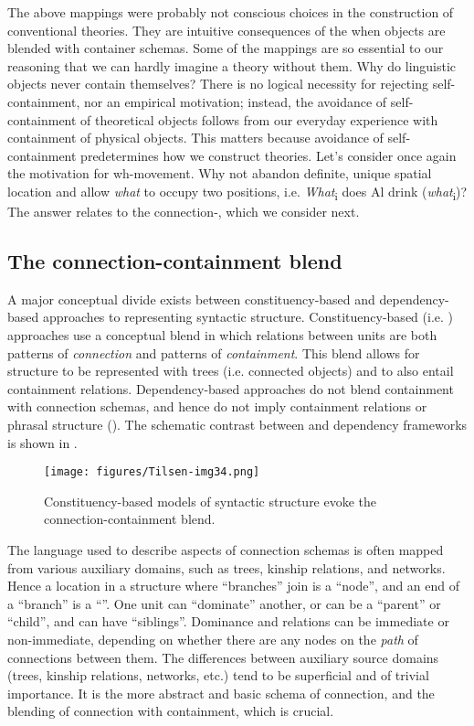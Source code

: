   The above mappings were probably not conscious choices in the construction of conventional theories. They are intuitive consequences of the  when objects are blended with container schemas. Some of the mappings are so essential to our reasoning that we can hardly imagine a theory without them. Why do linguistic objects never contain themselves? There is no logical necessity for rejecting self-containment, nor an empirical motivation; instead, the avoidance of self-containment of theoretical objects follows from our everyday experience with containment of physical objects. This matters because avoidance of self-containment predetermines how we construct theories. Let's consider once again the motivation for wh-movement. Why not abandon definite, unique spatial location and allow \textit{what} to occupy two positions, i.e. \textit{What}\textsubscript{i} does Al drink (\textit{what}\textsubscript{i})? The answer relates to the connection-, which we consider next.

\subsection{The connection-containment blend}

A major conceptual divide exists between constituency-based and dependency-based approaches to representing syntactic structure. Constituency-based (i.e. ) approaches use a conceptual blend in which relations between units are both patterns of \textit{connection} and patterns of \textit{containment}. This blend allows for structure to be represented with trees (i.e. connected objects) and to also entail containment relations. Dependency-based approaches do not blend containment with connection schemas, and hence do not imply containment relations or phrasal structure (\citealt{Hays1964,Melʹčuk1988,Osborne2006,OsborneEtAl2011,Percival1990,Tesnière2018}). The schematic contrast between  and dependency frameworks is shown in {}. 

  
\begin{figure}
\texttt{[image: figures/Tilsen-img34.png]}
\caption{Constituency-based models of syntactic structure evoke the connection-containment blend.}
\label{fig:3:6}
\end{figure}
 

  The language used to describe aspects of connection schemas is often mapped from various auxiliary domains, such as trees, kinship relations, and networks. Hence a location in a structure where “branches” join is a “node”, and an end of a “branch” is a “”. One unit can “dominate” another, or can be a “parent” or “child”, and can have “siblings”. Dominance and  relations can be immediate or non-immediate, depending on whether there are any nodes on the \textit{path} of connections between them. The differences between auxiliary source domains (trees, kinship relations, networks, etc.) tend to be superficial and of trivial importance. It is the more abstract and basic schema of connection, and the blending of connection with containment, which is crucial.   

